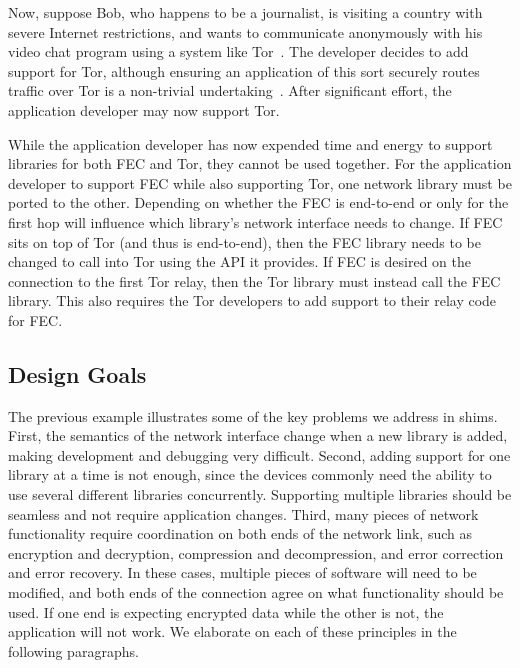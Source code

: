 Now, suppose Bob, who happens to be a journalist, is visiting a country with severe Internet restrictions, and wants to communicate anonymously with his video chat program using a system like Tor~\cite{tor}. The developer decides to add support for Tor, although ensuring an application of this sort securely routes traffic over Tor is a non-trivial undertaking~\cite{tor_skype_complexity}.   After significant effort, the application developer may now support Tor.

While the application developer has now expended time and energy to support libraries for both FEC and Tor, they cannot be used together.   For the application developer to support FEC while also supporting Tor, one network library must be ported to the other.   Depending on whether the FEC is end-to-end or only for the first hop will influence which library's network interface needs to change. If FEC sits on top of Tor (and thus is end-to-end), then the FEC library needs to be changed to call into Tor using the API it provides.  If FEC is desired on the connection to the first Tor relay, then the Tor library must instead call the FEC library.   This also requires the Tor developers to add support to their relay code for FEC. 

\subsection{Design Goals}

The previous example illustrates some of the key problems we address in shims.  First, the semantics of the network interface change when a new library is added, making development and debugging very difficult.  Second, adding support for one library at a time is not enough, since the devices commonly need the ability to use several different libraries concurrently.   Supporting multiple libraries should be seamless and not require application changes.   Third, many pieces of network functionality require coordination on both ends of the network link, such as encryption and decryption, compression and decompression, and error correction and error recovery.  In these cases, multiple pieces of software will need to be modified, and both ends of the connection agree on what functionality should be used.   If one end is expecting encrypted data while the other is not, the application will not work.   We elaborate on each of these principles in the following paragraphs.

